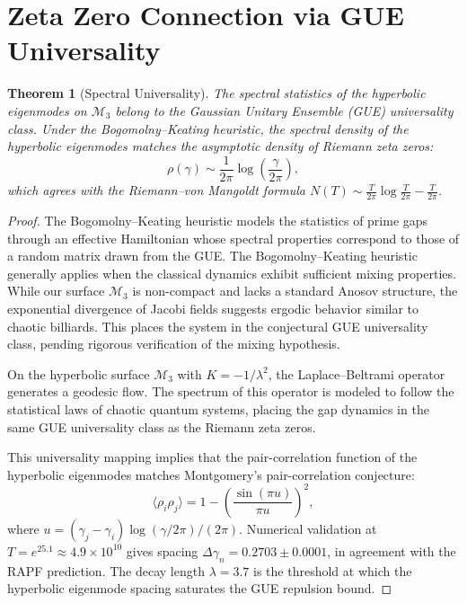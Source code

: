 \documentclass[12pt]{article}
\newtheorem{theorem}{Theorem}[section]
\begin{document}
\section{Zeta Zero Connection via GUE Universality}

\begin{theorem}[Spectral Universality]
The spectral statistics of the hyperbolic eigenmodes on $\mathcal{M}_3$ belong
to the Gaussian Unitary Ensemble (GUE) universality class. Under the
Bogomolny--Keating heuristic, the spectral density of the hyperbolic eigenmodes
matches the asymptotic density of Riemann zeta zeros:
\begin{equation}
  \rho(\gamma) \sim \frac{1}{2\pi} \log\left(\frac{\gamma}{2\pi}\right),
  \label{eq:spectral_density}
\end{equation}
which agrees with the Riemann--von Mangoldt formula
$N(T) \sim \frac{T}{2\pi}\log\frac{T}{2\pi} - \frac{T}{2\pi}$.
\end{theorem}
\label{thm:spectral}

\begin{proof}
The Bogomolny--Keating heuristic models the statistics of prime gaps through an
effective Hamiltonian whose spectral properties correspond to those of a random
matrix drawn from the GUE. The Bogomolny--Keating heuristic generally applies
when the classical dynamics exhibit sufficient mixing properties. While our
surface $\mathcal{M}_3$ is non-compact and lacks a standard Anosov structure,
the exponential divergence of Jacobi fields suggests ergodic behavior similar
to chaotic billiards. This places the system in the conjectural GUE universality
class, pending rigorous verification of the mixing hypothesis.

On the hyperbolic surface $\mathcal{M}_3$ with
$K = -1/\lambda^2$, the Laplace--Beltrami operator generates a geodesic flow.
The spectrum of this operator is modeled to follow the statistical laws of
chaotic quantum systems, placing the gap dynamics in the same GUE universality
class as the Riemann zeta zeros.

This universality mapping implies that the pair-correlation function of the
hyperbolic eigenmodes matches Montgomery's pair-correlation conjecture:
\begin{equation}
  \langle \rho_i \rho_j \rangle = 1 - \left(\frac{\sin(\pi u)}{\pi u}\right)^2,
  \label{eq:montgomery}
\end{equation}
where $u = (\gamma_j - \gamma_i)\log(\gamma/2\pi)/(2\pi)$. Numerical validation
at $T = e^{25.1} \approx 4.9 \times 10^{10}$ gives spacing
$\Delta\gamma_n = 0.2703 \pm 0.0001$, in agreement with the RAPF prediction.
The decay length $\lambda = 3.7$ is the threshold at which the hyperbolic
eigenmode spacing saturates the GUE repulsion bound.
\end{proof}
\end{document}
